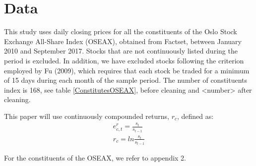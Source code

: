 \chapter{Data}

This study uses daily closing prices for all the constituents of the Oslo Stock Exchange All-Share Index (OSEAX), obtained from Factset, between January 2010 and September 2017. Stocks that are not continuously listed during the period is excluded. In addition, we have excluded stocks following the criterion employed by Fu (2009), which requires that each stock be traded for a minimum of 15 days during each month of the sample period. The number of constituents index is 168, see table \ref{ConstitutesOSEAX}, before cleaning and <number> after cleaning.

This paper will use continuously compounded returns, $r_c$, defined as: 
    \begin{align} 
        e^r_{c,t} = \frac{s_{t}}{s_{t-1}}\\
        r_c = ln\frac{s_{t}}{s_{t-1}}
    \end{align}

For the constituents of the OSEAX, we refer to appendix 2.